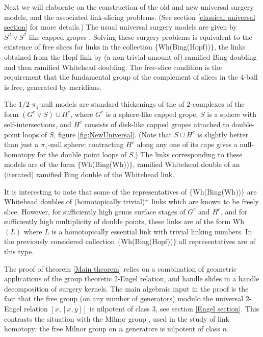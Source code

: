 \documentclass[12pt]{amsart}
\theoremstyle{definition}
\theoremstyle{remark}
\numberwithin{equation}{section}
\theoremstyle{plain}
\theoremstyle{definition}
\numberwithin{figure}{section}
\begin{document}
Next we will elaborate on the construction of the old and new universal surgery models, and the associated link-slicing problems. (See section \ref{classical universal section} for more details.)
The usual universal surgery models are given by $S^2\vee S^2$-like capped gropes \cite[Sections 2.4, 5.1]{FQ}. 
Solving these surgery problems is equivalent to the existence of free slices for links in the collection $\{$Wh(Bing(Hopf))$\}$, the links obtained from the Hopf link by (a non-trivial amount of) ramified Bing doubling and then ramified Whitehead doubling.  The free-slice condition is the requirement that the fundamental group of the complement of slices in the $4$-ball is free, generated by meridians.

The $1/2$-${\pi}_1$-null models are standard thickenings of the of $2$-complexes of the form $(G^c\vee S)\cup H^c$, where $G^c$ is a sphere-like capped grope, $S$ is a sphere with self-intersections, and $H^c$ consists of disk-like capped gropes attached to  double-point loops of $S$, figure \ref{fig:NewUniversal}. 
(Note that $S\cup H^c$ is slightly better than just a ${\pi}_1$-null sphere: contracting $H^c$ along any one of its caps gives a null-homotopy for the double point loops of $S$.)
The links corresponding to these models are of the form $\{$Wh(Bing(Wh))$\}$, ramified Whitehead double of an (iterated) ramified Bing double of the Whitehead link.



It is interesting to note that some of the representatives of $\{$Wh(Bing(Wh))$\}$ are Whitehead doubles of (homotopically trivial)$^+$ links which are known \cite{FT} to be freely slice. However, for sufficiently high genus surface stages of $G^c$ and $H^c$, and for sufficiently high multiplicity of double points, these links are of the form Wh$(L)$ where $L$ is a homotopically essential link with trivial linking numbers. In the previously considered collection $\{$Wh(Bing(Hopf))$\}$ all representatives are of this type.


The proof of theorem \ref{Main theorem} relies on a combination of geometric applications of the group theoretic $2$-Engel relation, and handle slides in a handle decomposition of surgery kernels. 
The main algebraic input in the proof is the fact that  the free group (on any number of generators) modulo the universal $2$-Engel relation $[x,[x,y]]$ is nilpotent of class $3$, see section \ref{Engel section}. This contrasts the situation with the Milnor group \cite{M}, used in the study of link homotopy: the free Milnor group on $n$ generators is nilpotent of class $n$.
\end{document}

